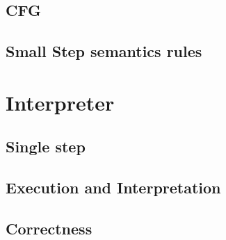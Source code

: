 \subsection{CFG}\label{subsection:cfg}
\subsection{Small Step semantics rules}\label{subsection:rules_small_step}

\section{Interpreter}\label{section:interpreter}

\subsection{Single step}\label{subsection:single_step}
\subsection{Execution and Interpretation}\label{subsection:exec_interp}
\subsection{Correctness}\label{subsection:correctness}
